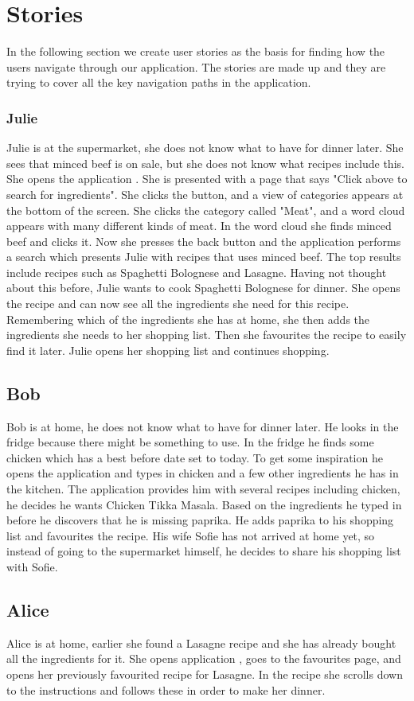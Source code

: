 \section{Stories}
In the following section we create user stories as the basis for finding how the users navigate through our application. The stories are made up and they are trying to cover all the key navigation paths in the application.

\subsubsection*{Julie}

Julie is at the supermarket, she does not know what to have for dinner later. She sees that minced beef is on sale, but she does not know what recipes include this. She opens the application \appname. She is presented with a page that says "Click above to search for ingredients". She clicks the button, and a view of categories appears at the bottom of the screen.  She clicks the category called "Meat", and a word cloud appears with many different kinds of meat. In the word cloud she finds minced beef and clicks it. Now she presses the back button and the application performs a search which presents Julie with recipes that uses minced beef. The top results include recipes such as Spaghetti Bolognese and Lasagne. Having not thought about this before, Julie wants to cook Spaghetti Bolognese for dinner. She opens the recipe and can now see all the ingredients she need for this recipe. Remembering which of the ingredients she has at home, she then adds the ingredients she needs to her shopping list. Then she favourites the recipe to easily find it later. Julie opens her shopping list and continues shopping.

\subsection*{Bob}
Bob is at home, he does not know what to have for dinner later. He looks in the fridge because there might be something to use. In the fridge he finds some chicken which has a best before date set to today. To get some inspiration he opens the application and types in chicken and a few other ingredients he has in the kitchen. The application provides him with several recipes including chicken, he decides he wants Chicken Tikka Masala. Based on the ingredients he typed in before he discovers that he is missing paprika. He adds paprika to his shopping list and favourites the recipe. His wife Sofie has not arrived at home yet, so instead of going to the supermarket himself, he decides to share his shopping list with Sofie.

\subsection*{Alice}
Alice is at home, earlier she found a Lasagne recipe and she has already bought all the ingredients for it. She opens application \appname, goes to the favourites page, and opens her previously favourited recipe for Lasagne. In the recipe she scrolls down to the instructions and follows these in order to make her dinner.
